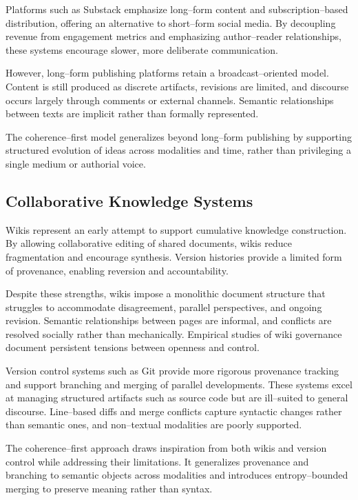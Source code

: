 \documentclass[11pt]{article}
\begin{document}
Platforms such as Substack emphasize long--form content and subscription--based
distribution, offering an alternative to short--form social media. By decoupling revenue
from engagement metrics and emphasizing author--reader relationships, these systems
encourage slower, more deliberate communication.

However, long--form publishing platforms retain a broadcast--oriented model. Content is
still produced as discrete artifacts, revisions are limited, and discourse occurs largely
through comments or external channels. Semantic relationships between texts are implicit
rather than formally represented.

The coherence--first model generalizes beyond long--form publishing by supporting
structured evolution of ideas across modalities and time, rather than privileging a
single medium or authorial voice.

\subsection{Collaborative Knowledge Systems}

Wikis represent an early attempt to support cumulative knowledge construction. By
allowing collaborative editing of shared documents, wikis reduce fragmentation and
encourage synthesis. Version histories provide a limited form of provenance, enabling
reversion and accountability.

Despite these strengths, wikis impose a monolithic document structure that struggles to
accommodate disagreement, parallel perspectives, and ongoing revision. Semantic
relationships between pages are informal, and conflicts are resolved socially rather than
mechanically. Empirical studies of wiki governance document persistent tensions between
openness and control.

Version control systems such as Git provide more rigorous provenance tracking and support
branching and merging of parallel developments. These systems excel at managing structured
artifacts such as source code but are ill--suited to general discourse. Line--based diffs
and merge conflicts capture syntactic changes rather than semantic ones, and non--textual
modalities are poorly supported.

The coherence--first approach draws inspiration from both wikis and version control while
addressing their limitations. It generalizes provenance and branching to semantic objects
across modalities and introduces entropy--bounded merging to preserve meaning rather than
syntax.
\end{document}
